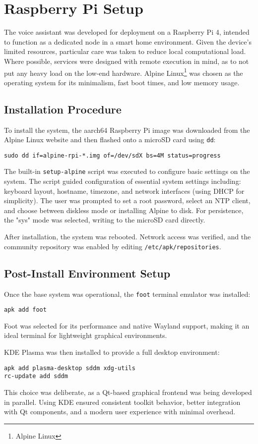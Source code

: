 \section{Raspberry Pi Setup}
The voice assistant was developed for deployment on a Raspberry Pi 4,
intended to function as a dedicated node in a smart home environment.
Given the device's limited resources, particular care was taken to reduce local computational load.
Where possible, services were designed with remote execution in mind,
as to not put any heavy load on the low-end hardware.
Alpine Linux\footnote{Alpine Linux\cite{alpine}}
was chosen as the operating system for its minimalism, fast boot times, and low memory usage.

\subsection{Installation Procedure}
To install the system, the aarch64 Raspberry Pi image was downloaded from the Alpine Linux website
and then flashed onto a microSD card using \texttt{dd}:
\begin{verbatim}
sudo dd if=alpine-rpi-*.img of=/dev/sdX bs=4M status=progress
\end{verbatim}

The built-in \texttt{setup-alpine} script was executed to configure basic settings on the system.
The script guided configuration of essential system settings including:
keyboard layout, hostname, timezone, and network interfaces (using DHCP for simplicity).
The user was prompted to set a root password, select an NTP client,
and choose between diskless mode or installing Alpine to disk.
For persistence, the "sys" mode was selected, writing to the microSD card directly.

After installation, the system was rebooted.
Network access was verified, and the community repository was enabled by editing \texttt{/etc/apk/repositories}.

\subsection{Post-Install Environment Setup}
Once the base system was operational, the \texttt{foot} terminal emulator was installed:
\begin{verbatim}
apk add foot
\end{verbatim}
Foot was selected for its performance and native Wayland support,
making it an ideal terminal for lightweight graphical environments.

KDE Plasma was then installed to provide a full desktop environment:
\begin{verbatim}
apk add plasma-desktop sddm xdg-utils
rc-update add sddm
\end{verbatim}
This choice was deliberate, as a Qt-based graphical frontend was being developed in parallel.
Using KDE ensured consistent toolkit behavior, better integration with Qt components, and a modern user experience with minimal overhead.
